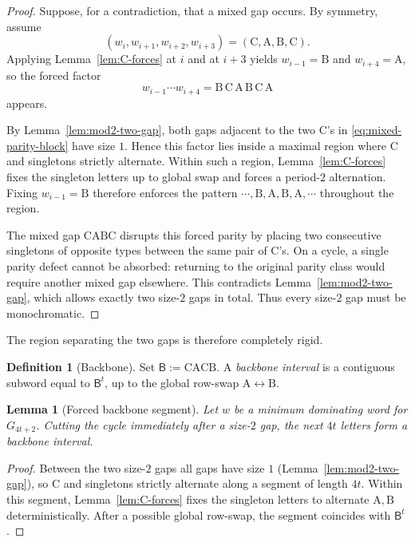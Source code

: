 \documentclass[11pt]{article}
\theoremstyle{plain}
\newtheorem{lemma}[theorem]{Lemma}
\theoremstyle{definition}
\newtheorem{definition}[theorem]{Definition}
\theoremstyle{remark}
\newcommand{\colA}{\mathrm{A}}
\newcommand{\colB}{\mathrm{B}}
\newcommand{\colC}{\mathrm{C}}
\begin{document}
\begin{proof}
Suppose, for a contradiction, that a mixed gap occurs.  By symmetry, assume
\[
(w_i,w_{i+1},w_{i+2},w_{i+3})=(\colC,\colA,\colB,\colC).
\]
Applying Lemma~\ref{lem:C-forces} at $i$ and at $i+3$ yields
$w_{i-1}=\colB$ and $w_{i+4}=\colA$, so the forced factor
\[
w_{i-1}\cdots w_{i+4}
=\colB\,\colC\,\colA\,\colB\,\colC\,\colA
\tag{$\ast$}\label{eq:mixed-parity-block}
\]
appears.

By Lemma~\ref{lem:mod2-two-gap}, both gaps adjacent to the two $\colC$'s in
\eqref{eq:mixed-parity-block} have size $1$.  Hence this factor lies inside a maximal
region where $\colC$ and singletons strictly alternate.  Within such a region,
Lemma~\ref{lem:C-forces} fixes the singleton letters up to global swap and forces a
period-$2$ alternation.  Fixing $w_{i-1}=\colB$ therefore enforces the pattern
$\cdots,\colB,\colA,\colB,\colA,\cdots$ throughout the region.

The mixed gap $\colC\colA\colB\colC$ disrupts this forced parity by placing two
consecutive singletons of opposite types between the same pair of $\colC$'s.
On a cycle, a single parity defect cannot be absorbed: returning to the original
parity class would require another mixed gap elsewhere.  This contradicts
Lemma~\ref{lem:mod2-two-gap}, which allows exactly two size-$2$ gaps in total.
Thus every size-$2$ gap must be monochromatic.
\end{proof}

The region separating the two gaps is therefore completely rigid.

\begin{definition}[Backbone]\label{def:backbone}
Set $\mathsf{B}:=\colC\colA\colC\colB$.  A \emph{backbone interval} is a contiguous subword
equal to $\mathsf{B}^t$, up to the global row-swap $\colA\leftrightarrow\colB$.
\end{definition}

\begin{lemma}[Forced backbone segment]\label{lem:mod2-backbone}
Let $w$ be a minimum dominating word for $G_{4t+2}$.  Cutting the cycle immediately after
a size-$2$ gap, the next $4t$ letters form a backbone interval.
\end{lemma}

\begin{proof}
Between the two size-$2$ gaps all gaps have size $1$
(Lemma~\ref{lem:mod2-two-gap}), so $\colC$ and singletons strictly alternate along a
segment of length $4t$.  Within this segment, Lemma~\ref{lem:C-forces} fixes the
singleton letters to alternate $\colA,\colB$ deterministically.  After a possible
global row-swap, the segment coincides with $\mathsf{B}^t$.
\end{proof}
\end{document}
